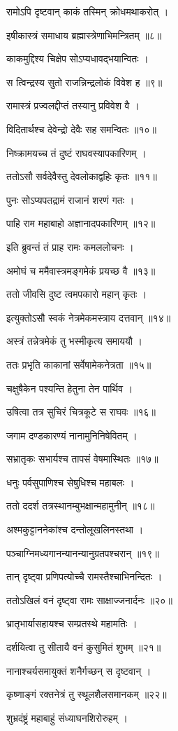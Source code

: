 रामोऽपि दृष्टवान् काकं तस्मिन् क्रोधमथाकरोत् ।

इषीकास्त्रं समाधाय ब्रह्मास्त्रेणाभिमन्त्रितम् ॥८॥

काकमुद्दिश्य चिक्षेप सोऽप्यधावद्भयान्वितः ।

स त्विन्द्रस्य सुतो राजन्निन्द्रलोकं विवेश ह ॥९॥

रामास्त्रं प्रज्वलद्दीप्तं तस्यानु प्रविवेश वै ।

विदितार्थश्च देवेन्द्रो देवैः सह समन्वितः ॥१०॥

निष्क्रामयच्च तं दुष्टं राघवस्यापकारिणम् ।

ततोऽसौ सर्वदेवैस्तु देवलोकाद्वहिः कृतः ॥११॥

पुनः सोऽप्यपतद्रामं राजानं शरणं गतः ।

पाहि राम महाबाहो अज्ञानादपकारिणम् ॥१२॥

इति ब्रुवन्तं तं प्राह रामः कमललोचनः ।

अमोघं च ममैवास्त्रमङ्गमेकं प्रयच्छ वै ॥१३॥

ततो जीवसि दुष्ट त्वमपकारो महान् कृतः ।

इत्युक्तोऽसौ स्वकं नेत्रमेकमस्त्राय दत्तवान् ॥१४॥

अस्त्रं तन्नेत्रमेकं तु भस्मीकृत्य समाययौ ।

ततः प्रभृति काकानां सर्वेषामेकनेत्रता ॥१५॥

चक्षुषैकेन पश्यन्ति हेतुना तेन पार्थिव ।

उषित्वा तत्र सुचिरं चित्रकूटे स राघवः ॥१६॥

जगाम दण्डकारण्यं नानामुनिनिषेवितम् ।

सभ्रातृकः सभार्यश्च तापसं वेषमास्थितः ॥१७॥

धनुः पर्वसुपाणिश्च सेषुधिश्च महाबलः ।

ततो ददर्श तत्रस्थानम्बुभक्षान्महामुनीन् ॥१८॥

अश्मकुट्टाननेकांश्च दन्तोलूखलिनस्तथा ।

पञ्चाग्निमध्यगानन्यानन्यानुग्रतपश्चरान् ॥१९॥

तान् दृष्ट्वा प्रणिपत्योच्चै रामस्तैश्चाभिनन्दितः ।

ततोऽखिलं वनं दृष्ट्वा रामः साक्षाज्जनार्दनः ॥२०॥

भ्रातृभार्यासहायश्च सम्प्रतस्थे महामतिः ।

दर्शयित्वा तु सीतायै वनं कुसुमितं शुभम् ॥२१॥

नानाश्चर्यसमायुक्तं शनैर्गच्छन् स दृष्टवान् ।

कृष्णाङ्गं रक्तनेत्रं तु स्थूलशैलसमानकम् ॥२२॥

शुभ्रदंष्ट्रं महाबाहुं संध्याघनशिरोरुहम् ।

